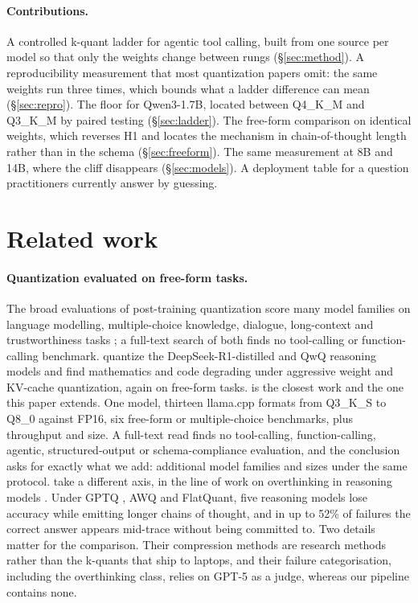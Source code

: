 \documentclass[11pt]{article}
\newcommand{\qm}{Qwen3-1.7B}
\begin{document}
\paragraph{Contributions.} A controlled k-quant ladder for agentic tool calling, built from one source per model so that only the weights change between rungs (\S\ref{sec:method}). A reproducibility measurement that most quantization papers omit: the same weights run three times, which bounds what a ladder difference can mean (\S\ref{sec:repro}). The floor for \qm{}, located between Q4\_K\_M and Q3\_K\_M by paired testing (\S\ref{sec:ladder}). The free-form comparison on identical weights, which reverses H1 and locates the mechanism in chain-of-thought length rather than in the schema (\S\ref{sec:freeform}). The same measurement at 8B and 14B, where the cliff disappears (\S\ref{sec:models}). A deployment table for a question practitioners currently answer by guessing.

\section{Related work}

\paragraph{Quantization evaluated on free-form tasks.} The broad evaluations of post-training quantization score many model families on language modelling, multiple-choice knowledge, dialogue, long-context and trustworthiness tasks \citep{jin2024comprehensive,li2024evaluating}; a full-text search of both finds no tool-calling or function-calling benchmark. \citet{liu2025quanthurts} quantize the DeepSeek-R1-distilled and QwQ reasoning models and find mathematics and code degrading under aggressive weight and KV-cache quantization, again on free-form tasks. \citet{kurt2026quant} is the closest work and the one this paper extends. One model, thirteen llama.cpp formats from Q3\_K\_S to Q8\_0 against FP16, six free-form or multiple-choice benchmarks, plus throughput and size. A full-text read finds no tool-calling, function-calling, agentic, structured-output or schema-compliance evaluation, and the conclusion asks for exactly what we add: additional model families and sizes under the same protocol. \citet{lotfi2026overthink} take a different axis, in the line of work on overthinking in reasoning models \citep{chen2024overthinking,sui2025stop}. Under GPTQ \citep{gptq2023}, AWQ \citep{awq2024} and FlatQuant, five reasoning models lose accuracy while emitting longer chains of thought, and in up to 52\% of failures the correct answer appears mid-trace without being committed to. Two details matter for the comparison. Their compression methods are research methods rather than the k-quants that ship to laptops, and their failure categorisation, including the overthinking class, relies on GPT-5 as a judge, whereas our pipeline contains none.
\end{document}
